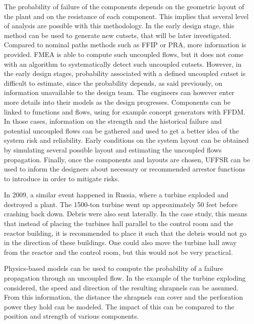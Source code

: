 The probability of failure of the components depends on the geometric layout of the plant and on the resistance of each component. This implies that several level of analysis are possible with this methodology. In the early design stage, this method can be used to generate new cutsets, that will be later investigated. Compared to nominal paths methods such as FFIP or PRA, more information is provided. FMEA is able to compute such uncoupled flows, but it does not come with an algorithm to systematically detect such uncoupled cutsets. However, in the early design stages, probability associated with a defined uncoupled cutset is difficult to estimate, since the probability depends, as said previously, on information unavailable to the design team. The engineers can however enter more details into their models as the design progresses. Components can be linked to functions and flows, using for example concept generators with FFDM. In those cases, information on the strength and the historical failure and potential uncoupled flows can be gathered and used to get a better idea of the system risk and reliability. Early conditions on the system layout can be obtained by simulating several possible layout and estimating the uncoupled flows propagation. Finally, once the components and layouts are chosen, UFFSR can be used to inform the designers about necessary or recommended arrestor functions to introduce in order to mitigate risks.

In 2009, a similar event happened in Russia, where a turbine exploded and destroyed a plant. The 1500-ton turbine went up approximately 50 feet before crashing back down. Debris were also sent laterally. In the case study, this means that instead of placing the turbines hall parallel to the control room and the reactor building, it is recommended to place it such that the debris would not go in the direction of these buildings. One could also move the turbine hall away from the reactor and the control room, but this would not be very practical.

Physics-based models can be used to compute the probability of a failure propagation through an uncoupled flow. In the example of the turbine exploding considered, the speed and direction of the resulting shrapnels can be assumed. From this information, the distance the shrapnels can cover and the perforation power they hold can be modeled. The impact of this can be compared to the position and strength of various components.

